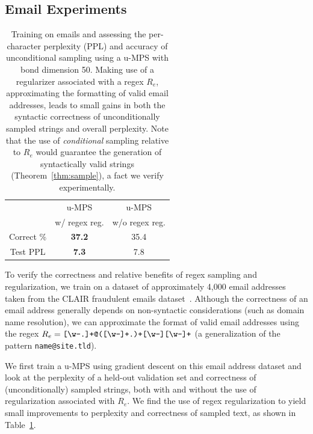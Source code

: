 \documentclass[twoside]{article}
\begin{document}
\subsection{Email Experiments}
%
\begin{table}[t]
\caption{Training on emails and assessing the per-character perplexity (PPL) and accuracy of unconditional sampling using a u-MPS with bond dimension 50. Making use of a regularizer associated with a regex $R_e$, approximating the formatting of valid email addresses, leads to small gains in both the syntactic correctness of unconditionally sampled strings and overall perplexity. Note that the use of \emph{conditional} sampling relative to $R_e$ would guarantee the generation of syntactically valid strings (Theorem~\ref{thm:sample}), a fact we verify experimentally.}
\label{tab:regularization}
\renewcommand{\arraystretch}{1.1}
\begin{center}
\begin{small}
\begin{sc}
\begin{tabular}{c|cc}
           & u-MPS          & u-MPS   \\
           & w/ regex reg.  & w/o regex reg. \\
\hline
Correct \% & \textbf{37.2}  & 35.4    \\
Test PPL   & \textbf{7.3}   & 7.8     \\
\end{tabular}
\end{sc}
\end{small}
\end{center}
\vskip -0.1in
\end{table}

To verify the correctness and relative benefits of regex sampling and regularization, we train on a dataset of approximately 4,000 email addresses taken from the CLAIR fraudulent emails dataset~\citep{radev2008}. Although the correctness of an email address generally depends on non-syntactic considerations (such as domain name resolution), we can approximate the format of valid email addresses using the regex $ R_{e} = \verb![\w-.]+@([\w-]+.)+[\w-][\w-]+! $ (a generalization of the pattern \texttt{name@site.tld}).

We first train a u-MPS using gradient descent on this email address dataset and look at the perplexity of a held-out validation set and correctness of (unconditionally) sampled strings, both with and without the use of regularization associated with $R_e$. We find the use of regex regularization to yield small improvements to perplexity and correctness of sampled text, as shown in Table~\ref{tab:regularization}. 
\end{document}

